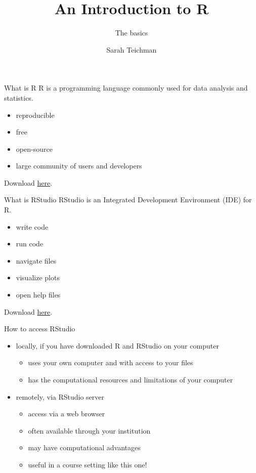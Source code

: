 \documentclass[
  ignorenonframetext,
]{beamer}
\title{An Introduction to R}
\subtitle{The basics}
\author{Sarah Teichman}
\date{}
\providecommand{\tightlist}{%
  \setlength{\itemsep}{0pt}\setlength{\parskip}{0pt}}
\begin{document}
\frame{\titlepage}

\begin{frame}{What is R}
\label{what-is-r}
R is a programming language commonly used for data analysis and
statistics.

\begin{itemize}
\tightlist
\item
  reproducible
\item
  free
\item
  open-source
\item
  large community of users and developers
\end{itemize}

Download \href{https://cran.rstudio.com/}{here}.
\end{frame}

\begin{frame}{What is RStudio}
\label{what-is-rstudio}
RStudio is an Integrated Development Environment (IDE) for R.

\begin{itemize}
\tightlist
\item
  write code
\item
  run code
\item
  navigate files
\item
  visualize plots
\item
  open help files
\end{itemize}

Download \href{https://posit.co/download/rstudio-desktop/}{here}.
\end{frame}

\begin{frame}{How to access RStudio}
\label{how-to-access-rstudio}
\begin{itemize}
\tightlist
\item
  locally, if you have downloaded R and RStudio on your computer

  \begin{itemize}
  \tightlist
  \item
    uses your own computer and with access to your files
  \item
    has the computational resources and limitations of your computer
  \end{itemize}
\item
  remotely, via RStudio server

  \begin{itemize}
  \tightlist
  \item
    access via a web browser
  \item
    often available through your institution
  \item
    may have computational advantages
  \item
    useful in a course setting like this one!
  \end{itemize}
\end{itemize}
\end{frame}
\end{document}
